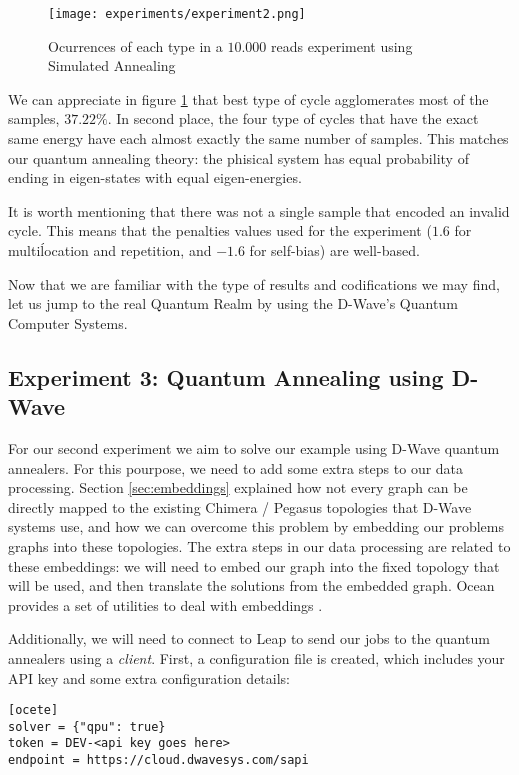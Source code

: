 \begin{figure}[H]
	\texttt{[image: experiments/experiment2.png]}
	\centering
	\caption{Ocurrences of each type in a $10.000$ reads experiment using Simulated Annealing}
	\label{fig:exp2-occ}
\end{figure}

We can appreciate in figure \ref{fig:exp2-occ} that best type of cycle agglomerates most of the samples, $37.22\%$. In second place, the four type of cycles that have the exact same energy have each almost exactly the same number of samples. This matches our quantum annealing theory: the phisical system has equal probability of ending in eigen-states with equal eigen-energies.

It is worth mentioning that there was not a single sample that encoded an invalid cycle. This means that the penalties values used for the experiment ($1.6$ for multiĺocation and repetition, and $-1.6$ for self-bias) are well-based.

Now that we are familiar with the type of results and codifications we may find, let us jump to the real Quantum Realm by using the D-Wave's Quantum Computer Systems.


\subsection{Experiment 3: Quantum Annealing using D-Wave}


For our second experiment we aim to solve our example using D-Wave quantum annealers. For this pourpose, we need to add some extra steps to our data processing. Section \ref{sec:embeddings} explained how not every graph can be directly mapped to the existing Chimera / Pegasus topologies that D-Wave systems use, and how we can overcome this problem by embedding our problems graphs into these topologies. The extra steps in our data processing are related to these embeddings: we will need to embed our graph into the fixed topology that will be used, and then translate the solutions from the embedded graph. Ocean provides a set of utilities to deal with embeddings \cite{DWave-OceanDoc-Embedding}.

Additionally, we will need to connect to Leap to send our jobs to the quantum annealers using a \emph{client}. First, a configuration file is created, which includes your API key and some extra configuration details:

\begin{verbatim}
[ocete]
solver = {"qpu": true}
token = DEV-<api key goes here>
endpoint = https://cloud.dwavesys.com/sapi
\end{verbatim}

